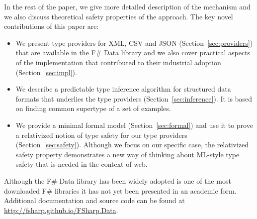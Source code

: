 \documentclass[preprint]{sigplanconf}
\begin{document}
In the rest of the paper, we give more detailed description of the mechanism and we also discuss
theoretical safety properties of the approach. The key novel contributions of this paper are:

\begin{itemize}
\item We present type providers for XML, CSV and JSON (Section~\ref{sec:providers}) 
  that are available in the F\# Data library and we also cover practical aspects of the 
  implementation that contributed to their industrial adoption (Section~\ref{sec:impl}). 

\item We describe a predictable type inference algorithm for structured data formats that
  underlies the type providers (Section~\ref{sec:inference}). It is based on finding common 
  supertype of a set of examples.

\item We provide a minimal formal model (Section~\ref{sec:formal}) and use it to prove a
  relativized notion of type safety for our type providers (Section~\ref{sec:safety}). Although 
  we focus on our specific case, the relativized safety property demonstrates a new way of 
  thinking about ML-style type safety that is needed in the context of web.
\end{itemize}

\noindent
Although the F\# Data library \cite{fsharp-data} has been widely adopted is one of the most downloaded F\# libraries 
it has not yet been presented in an academic form. Additional documentation and source code can 
be found at \url{http://fsharp.github.io/FSharp.Data}.



%
%
\end{document}
